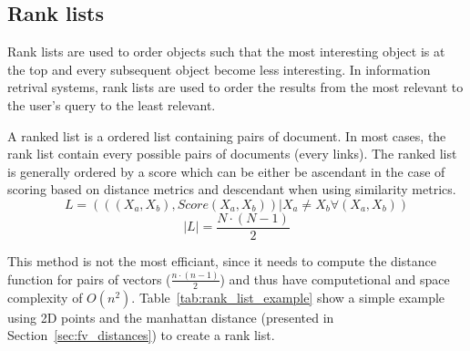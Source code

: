 \subsection{Rank lists}

Rank lists are used to order objects such that the most interesting object is at the top and every subsequent object become less interesting.
In information retrival systems, rank lists are used to order the results from the most relevant to the user's query to the least relevant.

\begin{definition}
  A ranked list is a ordered list containing pairs of document.
  In most cases, the rank list contain every possible pairs of documents (every links).
  The ranked list is generally ordered by a score which can be either be ascendant in the case of scoring based on distance metrics and descendant when using similarity metrics.
  \begin{equation}
    L = (((X_a, X_b), Score(X_a, X_b)) | X_a \neq X_b \forall (X_a, X_b))
  \end{equation}
  \begin{equation}
    |L| = \frac{N \cdot (N - 1)}{2}
  \end{equation}
\end{definition}

This method is not the most efficiant, since it needs to compute the distance function for pairs of vectors ($\frac{n \cdot (n - 1)}{2}$) and thus have computetional and space complexity of $O(n^2)$.
Table~\ref{tab:rank_list_example} show a simple example using 2D points and the manhattan distance (presented in Section~\ref{sec:fv_distances}) to create a rank list.


